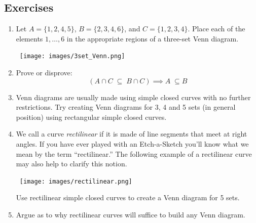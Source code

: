 \documentclass[10pt,]{book}
\theoremstyle{plain}
\theoremstyle{definition}
\theoremstyle{definition}
\numberwithin{equation}{section}
\newcommand{\hint}[1]{ }
\begin{document}
\subsection[{Exercises}]{Exercises}\label{exercises-24}
\leavevmode%
\begin{enumerate}[label=(\alph*)]
\item\hypertarget{li-339}{}
          Let \(A = \{1,2,4,5\}\), \(B=\{2,3,4,6\}\), and \(C=\{1,2,3,4\}\).  Place each of the elements \(1, \ldots , 6\) in the appropriate regions of a three-set Venn diagram.

          \
          \texttt{[image: images/3set\_Venn.png]}

          \hint{The center region contains \(2\) and \(4\).}
\item\hypertarget{li-340}{}
          Prove or disprove:
          \begin{equation*}
            ( A \cap C \; \subseteq \; B \cap C )  \implies  A \; \subseteq B
          \end{equation*}
          \hint{What will be the implications of the region \(A \cap \overline{B} \cap \overline{C}\) being non-empty?}
\item\hypertarget{li-341}{}
          Venn diagrams are usually made using simple closed curves 
          with no further restrictions.  Try creating Venn diagrams for 3, 4 and
          5 sets (in general position) using rectangular simple closed curves.

          \hint{I found it easier to experiment by making my drawings on graph paper.  I never did  
          manage to draw the \(5\) set Venn diagram with just rectangles\dots{} probably just a lack of persistence.}
\item\hypertarget{li-342}{}
          We call a curve \emph{rectilinear} if it is made
          of line segments that meet at right angles.  If you have ever
          played with an Etch-a-Sketch you'll know what we mean by the term 
          ``rectilinear.''  The following example of a rectilinear curve may
          also help to clarify this notion.

          \
          \texttt{[image: images/rectilinear.png]}

          Use rectilinear
          simple closed curves to create a Venn diagram for 5 sets.

          \hint{Of course, rectangles are rectilinear, so one could use the solution from the previous
          problem (if, unlike me, you were persistant enough to find it).  Otherwise, 
          start with the \(4\) set diagram made with rectangles and use your \(5\)th (rectilinear) curve to split
          each region into \(2\) \textemdash{} don't forget to split the region on the outside too.}
\item\hypertarget{li-343}{}
          Argue as to why rectilinear curves will suffice to build
          any Venn diagram.


\end{enumerate}
\end{document}
